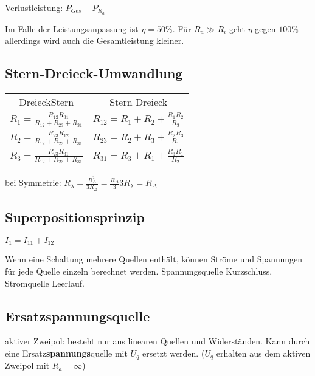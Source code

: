 \documentclass[10pt,a4paper]{scrartcl}
\begin{document}
\begin{multicols*}{3}
	Verlustleistung: $P_{Ges}-P_{R_a}$
	
	Im Falle der Leistungsanpassung ist $\eta=50\%$. Für $R_a\gg R_i$ geht $\eta$ gegen $100\%$ allerdings wird auch die Gesamtleistung kleiner. 
	
	\subsection{Stern-Dreieck-Umwandlung}
	
	\begin{center}
	\begin{tabular}{cc}
	Dreieck\dahe Stern&Stern \dahe Dreieck\\
	$R_1=\frac{R_{12}R_{31}}{R_{12}+R_{23}+R_{31}}$&$R_{12}=R_1+R_2+\frac{R_1R_2}{R_3}$\\
	$R_2=\frac{R_{23}R_{12}}{R_{12}+R_{23}+R_{31}}$&$R_{23}=R_2+R_3+\frac{R_2R_3}{R_1}$\\
	$R_3=\frac{R_{23}R_{31}}{R_{12}+R_{23}+R_{31}}$&$R_{31}=R_3+R_1+\frac{R_3R_1}{R_2}$
	\end{tabular}
	\end{center}
	
	bei Symmetrie: $R_\lambda=\frac{R_\Delta^2}{3R_\Delta}=\frac{R_\Delta}{3}$\hfill$3R_\lambda=R_\Delta$

	\vfill
	\null
	\columnbreak
	
	\subsection{Superpositionsprinzip}
	
	
	\begin{center}$I_1=I_{11}+I_{12}$\end{center}
	
	Wenn eine Schaltung mehrere Quellen enthält, können Ströme und Spannungen für jede Quelle einzeln berechnet werden. Spannungsquelle \dahe Kurzschluss, Stromquelle \dahe Leerlauf.
	
	\subsection{Ersatzspannungsquelle}
	
	aktiver Zweipol: besteht nur aus linearen Quellen und Widerständen. Kann durch eine Ersatz\textbf{spannungs}quelle mit $U_q$ ersetzt werden. ($U_q$ erhalten aus dem aktiven Zweipol mit $R_a=\infty$)
	

\end{multicols*}
\end{document}
